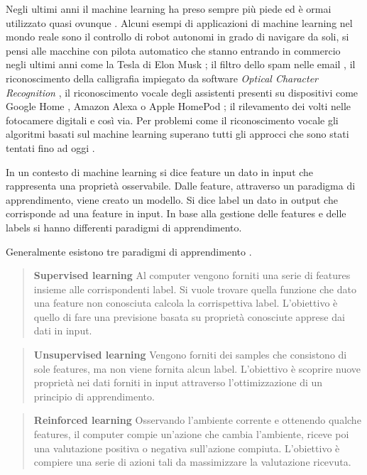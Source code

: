 \documentclass[../main.tex]{subfiles}
\begin{document}
Negli ultimi anni il machine learning ha preso sempre più piede ed è ormai utilizzato quasi ovunque \cite{compIntelligence}. Alcuni esempi di applicazioni di machine learning nel mondo reale sono il controllo di robot autonomi in grado di navigare da soli, si pensi alle macchine con pilota automatico che stanno entrando in commercio negli ultimi anni come la Tesla di Elon Musk \cite{tesla}; il filtro dello spam nelle email \cite{spamemail}, il riconoscimento della calligrafia impiegato da software \textit{Optical Character Recognition} \cite{ocr}, il riconoscimento vocale degli assistenti presenti su dispositivi come Google Home \cite{googlehome}, Amazon Alexa \cite{amazonalexa} o Apple HomePod \cite{applehomepod}; il rilevamento dei volti nelle fotocamere digitali \cite{facialrecognition} e così via.
Per problemi come il riconoscimento vocale gli algoritmi basati sul machine learning superano tutti gli approcci che sono stati tentati fino ad oggi \cite{mldef}.

In un contesto di machine learning si dice feature un dato in input che rappresenta una proprietà osservabile. Dalle feature, attraverso un paradigma di apprendimento, viene creato un modello. Si dice label un dato in output che corrisponde ad una feature in input. In base alla gestione delle features e delle labels si hanno differenti paradigmi di apprendimento.

Generalmente esistono tre paradigmi di apprendimento \cite{ai}.
\begin{verse}
				\textbf{Supervised learning} Al computer vengono forniti una serie di features insieme alle corrispondenti label. Si vuole trovare quella funzione che dato una feature non conosciuta calcola la corrispettiva label. L'obiettivo è quello di fare una previsione basata su proprietà conosciute apprese dai dati in input.
\end{verse}

\begin{verse}
				\textbf{Unsupervised learning} Vengono forniti dei samples che consistono di sole features, ma non viene fornita alcun label. L'obiettivo è scoprire nuove proprietà nei dati forniti in input attraverso l'ottimizzazione di un principio di apprendimento.
\end{verse}

\begin{verse}
				\textbf{Reinforced learning} Osservando l'ambiente corrente e ottenendo qualche features, il computer compie un'azione che cambia l'ambiente, riceve poi una valutazione positiva o negativa sull'azione compiuta. L'obiettivo è compiere una serie di azioni tali da massimizzare la valutazione ricevuta.
\end{verse}
\end{document}
